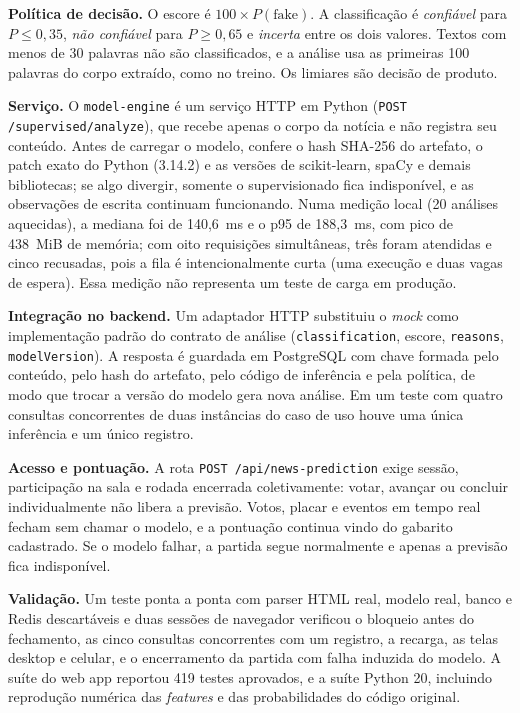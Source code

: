 \documentclass[brazilian,11pt,a4paper]{article}
\begin{document}
\textbf{Política de decisão.} O escore é $100\times P(\text{fake})$. A classificação é \emph{confiável} para $P\le0{,}35$, \emph{não confiável} para $P\ge0{,}65$ e \emph{incerta} entre os dois valores. Textos com menos de 30 palavras não são classificados, e a análise usa as primeiras 100 palavras do corpo extraído, como no treino. Os limiares são decisão de produto.

\textbf{Serviço.} O \texttt{model-engine} é um serviço HTTP em Python (\texttt{POST /supervised/analyze}), que recebe apenas o corpo da notícia e não registra seu conteúdo. Antes de carregar o modelo, confere o hash SHA-256 do artefato, o patch exato do Python (3.14.2) e as versões de scikit-learn, spaCy e demais bibliotecas; se algo divergir, somente o supervisionado fica indisponível, e as observações de escrita continuam funcionando. Numa medição local (20 análises aquecidas), a mediana foi de 140,6~ms e o p95 de 188,3~ms, com pico de 438~MiB de memória; com oito requisições simultâneas, três foram atendidas e cinco recusadas, pois a fila é intencionalmente curta (uma execução e duas vagas de espera). Essa medição não representa um teste de carga em produção.

\textbf{Integração no backend.} Um adaptador HTTP substituiu o \textit{mock} como implementação padrão do contrato de análise (\texttt{classification}, escore, \texttt{reasons}, \texttt{modelVersion}). A resposta é guardada em PostgreSQL com chave formada pelo conteúdo, pelo hash do artefato, pelo código de inferência e pela política, de modo que trocar a versão do modelo gera nova análise. Em um teste com quatro consultas concorrentes de duas instâncias do caso de uso houve uma única inferência e um único registro.

\textbf{Acesso e pontuação.} A rota \texttt{POST /api/news-prediction} exige sessão, participação na sala e rodada encerrada coletivamente: votar, avançar ou concluir individualmente não libera a previsão. Votos, placar e eventos em tempo real fecham sem chamar o modelo, e a pontuação continua vindo do gabarito cadastrado. Se o modelo falhar, a partida segue normalmente e apenas a previsão fica indisponível.

\textbf{Validação.} Um teste ponta a ponta com parser HTML real, modelo real, banco e Redis descartáveis e duas sessões de navegador verificou o bloqueio antes do fechamento, as cinco consultas concorrentes com um registro, a recarga, as telas desktop e celular, e o encerramento da partida com falha induzida do modelo. A suíte do web app reportou 419 testes aprovados, e a suíte Python 20, incluindo reprodução numérica das \textit{features} e das probabilidades do código original.
\end{document}
